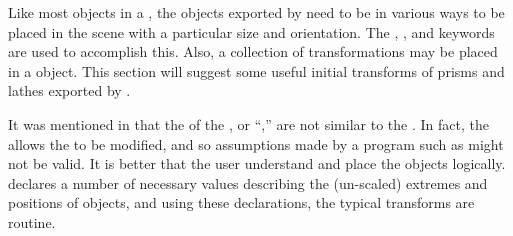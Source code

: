 	Like most objects in a \IXpov{} ,
	the objects exported by \IXpkg{} need to be
	 in various ways to be
	placed in the scene with a particular size and
	orientation. The ,
	, and
	 keywords are used to
	accomplish this. Also, a collection of transformations
	may be placed in a  object.
	This section will suggest some useful initial transforms
	of prisms and lathes exported
	by \IXpkg{}.
	
	It was mentioned in 
	that the  of the \IXpkg{}
	, or ``,''
	are not similar to the \IXpov{}
	. In fact, the 
	allows the \IXpov{} 
	to be modified, and so assumptions made by a program
	such as \IXpkg{} might not be valid. It is better that
	the user understand \IXpov{}  and
	place the objects logically. \IXpkgu{} declares a number
	of necessary values describing the (un-scaled) extremes
	and positions of objects, and using these declarations,
	the typical transforms are routine.


